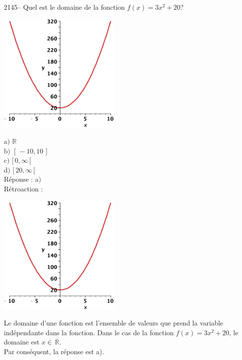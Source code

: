 \documentclass[letterpaper, 12pt]{article}
\begin{document}
2145-- Quel est le domaine de la fonction $f(x)=3x^{2}+20$?
\begin{center}
 \includegraphics[width=6cm,bb=20 118 575 673]{Q2145.eps}
\end{center}

a$)$ $\mathbb{R}$\\[2mm]
b$)$ $[\, -10 , 10 \,]$\\[2mm]
c$)$ $[\, 0 , \infty \,[$\\[2mm]
d$)$ $[\, 20 , \infty \,[$\\

R\'eponse : a$)$\\

R\'etroaction :
\begin{center}
 \includegraphics[width=6cm,bb=20 118 575 673]{Q2145.eps}
\end{center}
Le domaine d'une fonction est l'ensemble de valeurs que prend la variable ind\'ependante dans la fonction. Dans le cas de la fonction $f(x)=3x^{2}+20$, le domaine est $x\in \,\mathbb{R}$.\\
Par cons\'equent, la r\'eponse est a).\\
\end{document}
